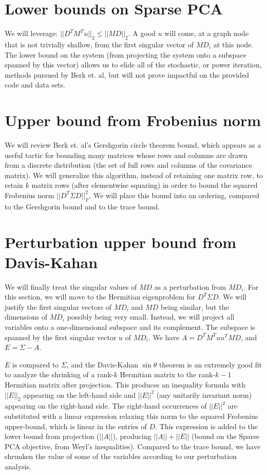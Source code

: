 \documentclass{article}
\begin{document}
\section{Lower bounds on Sparse PCA}

We will leverage: $||D^TM^Tu||_2 \le ||MD||_2$. A good $u$ will come, at a graph node that is not trivially shallow, from the first singular vector of $MD_i$ at this node. The lower bound on the system (from projecting the system onto a subspace spanned by this vector) allows us to elide all of the stochastic, or power iteration, methods pursued by Berk et. al, but will not prove impactful on the provided code and data sets.

\section{Upper bound from Frobenius norm}

We will review Berk et. al's Gershgorin circle theorem bound, which appears as a useful tactic for bounding many matrices whose rows and columns are drawn from a discrete distribution (the set of full rows and columns of the covariance matrix). We will generalize this algorithm, instead of retaining one matrix row, to retain $k$ matrix rows (after elementwise squaring) in order to bound the squared Frobenius norm $||D^T \Sigma D||_F^2$. We will place this bound into an ordering, compared to the Gershgorin bound and to the trace bound.

\section{Perturbation upper bound from Davis-Kahan}

We will finally treat the singular values of $MD$ as a perturbation from $MD_i$. For this section, we will move to the Hermitian eigenproblem for $D^T \Sigma D$. We will justify the first singular vectors of $MD_i$ and $MD$ being similar, but the dimensions of $MD_i$ possibly being very small. Instead, we will project all variables onto a one-dimensional subspace and its complement. The subspace is spanned by the first singular vector $u$ of $MD_i$. We have $A = D^T M^T uu^T M D$, and $E = \Sigma - A$.

$E$ is compared to $\Sigma$, and the Davis-Kahan $\sin\theta$ theorem is an extremely good fit to analyze the shrinking of a rank-$k$ Hermitian matrix to the rank-$k-1$ Hermitian matrix after projection. This produces an inequality formula with $||E||_2$ appearing on the left-hand side and $||E||^2$ (any unitarily invariant norm) appearing on the right-hand side. The right-hand occurrences of $||E||^2$ are substituted with a linear expression relaxing this norm to the squared Frobenius upper-bound, which is linear in the entries of $D$. This expression is added to the lower bound from projection ($||A||$), producing $||A||+||E||$ (bound on the Sparse PCA objective, from Weyl's inequalities). Compared to the trace bound, we have shrunken the value of some of the variables according to our perturbation analysis.
\end{document}
